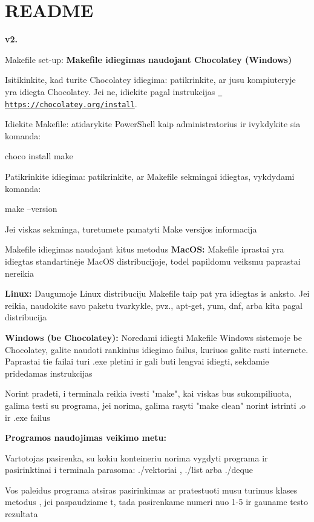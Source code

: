 \chapter{README}
\hypertarget{md__r_e_a_d_m_e}{}\label{md__r_e_a_d_m_e}
{\bfseries{v2.}}

Makefile set-\/up\+: {\bfseries{Makefile idiegimas naudojant Chocolatey (Windows)}}

Isitikinkite, kad turite Chocolatey idiegima\+: patikrinkite, ar jusu kompiuteryje yra idiegta Chocolatey. Jei ne, idiekite pagal instrukcijas \href{https://chocolatey.org/install}{\texttt{ https\+://chocolatey.\+org/install}}.

Idiekite Makefile\+: atidarykite Power\+Shell kaip administratorius ir ivykdykite sia komanda\+:

choco install make

Patikrinkite idiegima\+: patikrinkite, ar Makefile sekmingai idiegtas, vykdydami komanda\+:

make --version

Jei viskas sekminga, turetumete pamatyti Make versijos informacija

Makefile idiegimas naudojant kitus metodus {\bfseries{Mac\+OS\+:}} Makefile iprastai yra idiegtas standartinėje Mac\+OS distribucijoje, todel papildomu veiksmu paprastai nereikia

{\bfseries{Linux\+:}} Daugumoje Linux distribuciju Makefile taip pat yra idiegtas is anksto. Jei reikia, naudokite savo paketu tvarkykle, pvz., apt-\/get, yum, dnf, arba kita pagal distribucija

{\bfseries{Windows (be Chocolatey)\+:}} Noredami idiegti Makefile Windows sistemoje be Chocolatey, galite naudoti rankinius idiegimo failus, kuriuos galite rasti internete. Paprastai tie failai turi .exe pletini ir gali buti lengvai idiegti, sekdamie pridedamas instrukcijas

Norint pradeti, i terminala reikia ivesti "{}make"{}, kai viskas bus sukompiliuota, galima testi su programa, jei norima, galima rasyti "{}make clean"{} norint istrinti .o ir .exe failus

{\bfseries{Programos naudojimas veikimo metu\+:}}

Vartotojas pasirenka, su kokiu konteineriu norima vygdyti programa ir pasirinktinai i terminala parasoma\+: ./vektoriai , ./list arba ./deque

Vos paleidus programa atsiras pasirinkimas ar pratestuoti musu turimus klases metodus , jei paspaudziame \textquotesingle{}t\textquotesingle{}, tada pasirenkame numeri nuo 1-\/5 ir gauname testo rezultata

